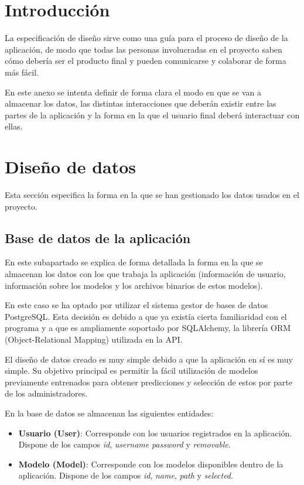 \label{cha:Especificación de diseño}

\section{Introducción}

La especificación de diseño sirve como una guía para el proceso de diseño de la
aplicación, de modo que todas las personas involucradas en el proyecto saben
cómo debería ser el producto final y pueden comunicarse y colaborar de forma más
fácil.

En este anexo se intenta definir de forma clara el modo en que se van a
almacenar los datos, las distintas interacciones que deberán existir entre las
partes de la aplicación y la forma en la que el usuario final deberá interactuar
con ellas.

\section{Diseño de datos}

Esta sección especifica la forma en la que se han gestionado los datos usados
en el proyecto.

\subsection{Base de datos de la aplicación}

En este subapartado se explica de forma detallada la forma en la que se
almacenan los datos con los que trabaja la aplicación (información de usuario,
información sobre los modelos y los archivos binarios de estos modelos).

En este caso se ha optado por utilizar el sistema gestor de bases de datos
PostgreSQL. Esta decisión es debido a que ya existía cierta familiaridad con el
programa y a que es ampliamente soportado por SQLAlchemy, la librería ORM
(Object-Relational Mapping) utilizada en la API.

El diseño de datos creado es muy simple debido a que la aplicación en sí es muy
simple. Su objetivo principal es permitir la fácil utilización de modelos
previamente entrenados para obtener predicciones y selección de estos por parte
de los administradores.

En la base de datos se almacenan las siguientes entidades:

\begin{itemize}
    \item \textbf{Usuario (User)}: Corresponde con los usuarios registrados en
    la aplicación. Dispone de los campos \textit{id}, \textit{username}
    \textit{password} y \textit{removable}.
    \item \textbf{Modelo (Model)}: Corresponde con los modelos disponibles
    dentro de la aplicación. Dispone de los campos \textit{id}, \textit{name},
    \textit{path} y \textit{selected}.
\end{itemize}

